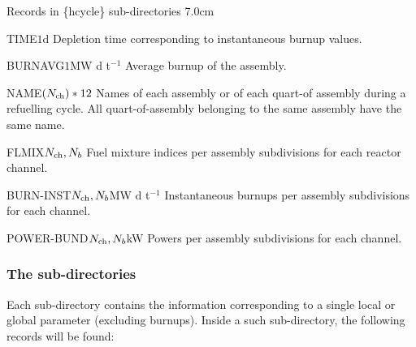 \begin{DescriptionEnregistrement}{Records in \{hcycle\} sub-directories}
{7.0cm} \label{tabl:tabhcycle}

\RealEnr
 {TIME}{$1$}{d}
 {Depletion time corresponding to instantaneous burnup values.}

\RealEnr
 {BURNAVG}{$1$}{MW d t$^{-1}$}
 {Average burnup of the assembly.}

\CharEnr
 {NAME}{$(N_{\rm ch})*12$}
 {Names of each assembly or of each quart-of assembly during a refuelling cycle. All
 quart-of-assembly belonging to the same assembly have the same name.}

\IntEnr
 {FLMIX}{$N_{\rm ch}, N_b$}
 {Fuel mixture indices per assembly subdivisions for each reactor channel.}

\RealEnr
 {BURN-INST}{$N_{\rm ch}, N_b$}{MW d t$^{-1}$}
 {Instantaneous burnups per assembly subdivisions for each channel.}

\RealEnr
 {POWER-BUND}{$N_{\rm ch}, N_b$}{kW}
 {Powers per assembly subdivisions for each channel.}

\end{DescriptionEnregistrement}

\subsubsection{The  sub-directories}\label{sect:dirparam}

Each  sub-directory contains the information corresponding
to a single local or global parameter (excluding  burnups). Inside a such sub-directory,
the following records will be found:

